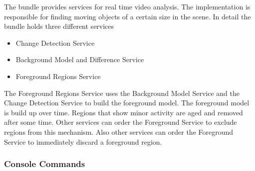 
The bundle provides services for real time video analysis. The implementation is responsible for finding moving objects of a certain size in the scene. In detail the bundle holds three different services

\begin{itemize}
 \item Change Detection Service
 \item Background Model and Difference Service
 \item Foreground Regions Service
\end{itemize}

The Foreground Regions Service uses the Background Model Service and the Change Detection Service to build the foreground model. The foreground model is build up over time. Regions that show minor activity are aged and removed after some time. Other services can order the Foreground Service to exclude regions from this mechanism. Also other services can order the Foreground Service to immediately discard a foreground region.


\subsubsection{Console Commands}

